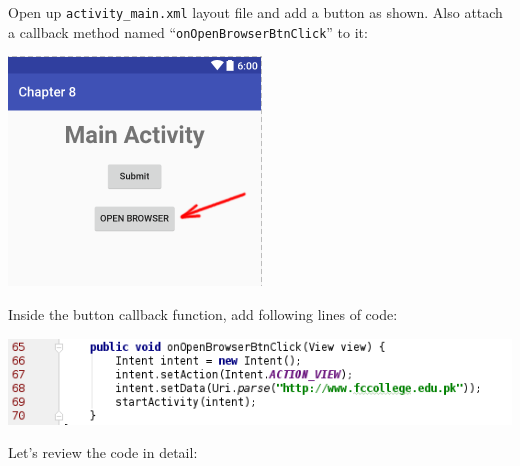 Open up \texttt{activity\_main.xml} layout file and add a button as shown. Also attach a callback method named ``\texttt{onOpenBrowserBtnClick}'' to it:

\begin{center}
	\includegraphics[scale=0.4]{chapters/ch09/images/22}
\end{center}

Inside the button callback function, add following lines of code:

\begin{center}
	\includegraphics[scale=0.4]{chapters/ch09/images/23}
\end{center}

Let's review the code in detail:

